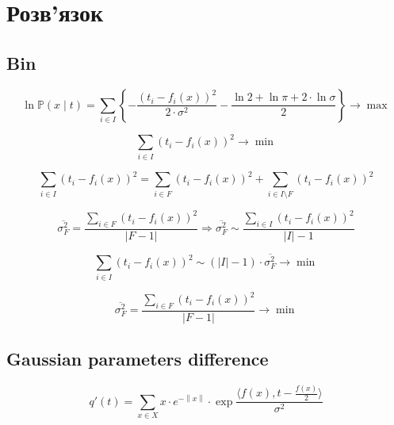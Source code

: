 \section{Розв'язок}

\subsection{Bin}

\begin{equation*}
  \ln{\mathbb{P}\left( x \mid t \right)}
  = \sum_{i \in I}
    \left\{
      - \frac{\left( t_i - f_i\left( x \right) \right)^2}{2 \cdot \sigma^2}
      - \frac{\ln{2} + \ln{\pi} + 2 \cdot \ln{\sigma}}{2}
    \right\}
  \to \max
\end{equation*}

\begin{equation*}
  \sum_{i \in I} \left( t_i - f_i\left( x \right) \right)^2 \to \min
\end{equation*}

\begin{equation*}
  \sum_{i \in I} \left( t_i - f_i\left( x \right) \right)^2
  = \sum_{i \in F} \left( t_i - f_i\left( x \right) \right)^2
  + \sum_{i \in I \setminus F} \left( t_i - f_i\left( x \right) \right)^2
\end{equation*}

\begin{equation*}
    \overline{\sigma_F^2}
    = \frac{\sum\limits_{i \in F} \left( t_i - f_i\left( x \right) \right)^2}
           {\left| F - 1 \right|}
    \Rightarrow
    \overline{\sigma_F^2}
    \sim \frac{\sum\limits_{i \in I}
                 \left( t_i - f_i\left( x \right) \right)^2}
               {\left| I \right| - 1}
\end{equation*}

\begin{equation*}
  \sum_{i \in I} \left( t_i - f_i\left( x \right) \right)^2
  \sim \left( \left| I \right| - 1 \right) \cdot \overline{\sigma_F^2}
  \to \min
\end{equation*}

\begin{equation*}
  \overline{\sigma_F^2}
  = \frac{\sum\limits_{i \in F} \left( t_i - f_i\left( x \right) \right)^2}
         {\left| F - 1 \right|}
  \to \min
\end{equation*}

\subsection{Gaussian parameters difference}
\begin{equation*}
  q'\left( t \right)
  = \sum_{x \in X}
    x
    \cdot e^{- \left\| x \right\|}
    \cdot \exp{\frac{\langle f\left(x\right),
      t - \frac{f\left(x\right)}{2} \rangle}{\sigma^2}}
\end{equation*}


